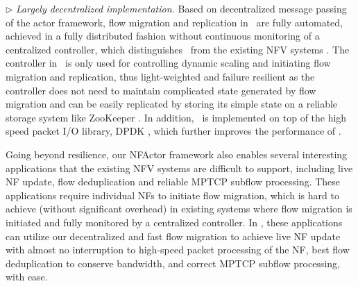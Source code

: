 

$\triangleright$ {\em Largely decentralized implementation.} Based on decentralized message passing of the actor framework, flow migration and replication in \nfactor~are fully automated, achieved in a fully distributed fashion without continuous monitoring of a centralized controller, which distinguishes \nfactor~from the existing NFV systems \cite{gember2015opennf}. The controller in \nfactor~is only used for controlling dynamic scaling and initiating flow migration and replication,
thus light-weighted and failure resilient as the controller does not need to maintain complicated state generated by flow migration and can be easily replicated by storing its simple state on a reliable storage system like ZooKeeper \cite{hunt2010zookeeper}.
In addition, \nfactor~is implemented on top of the high speed packet I/O library, DPDK \cite{dpdk}, which further improves the performance of \nfactor.



Going beyond resilience, our NFActor framework also enables several interesting applications that the existing NFV systems are difficult to support, including live NF update, flow deduplication and reliable MPTCP subflow processing. These applications require individual NFs to initiate flow migration, %
which is hard to achieve (without significant overhead) in existing systems where flow migration is initiated and fully monitored by a centralized controller. In \nfactor, these applications can utilize our decentralized and fast flow migration to achieve live NF update with almost no interruption to high-speed packet processing of the NF, best flow deduplication to conserve bandwidth, and correct MPTCP subflow processing, with ease. %

